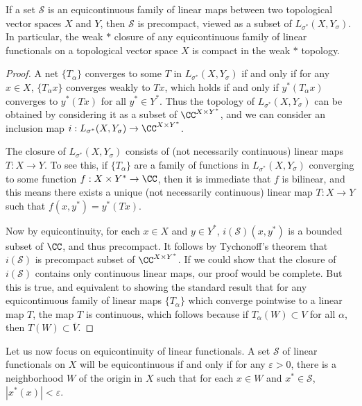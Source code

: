 \begin{theorem}
    If a set $\mathcal{S}$ is an equicontinuous family of linear maps between two topological vector spaces $X$ and $Y$, then $\mathcal{S}$ is precompact, viewed as a subset of $L_{\sigma^*}(X,Y_\sigma)$. In particular, the weak $*$ closure of any equicontinuous family of linear functionals on a topological vector space $X$ is compact in the weak $*$ topology.
\end{theorem}
\begin{proof}
    A net $\{ T_\alpha \}$ converges to some $T$ in $L_{\sigma^*}(X,Y_\sigma)$ if and only if for any $x \in X$, $\{ T_\alpha x \}$ converges weakly to $Tx$, which holds if and only if $y^*(T_\alpha x)$ converges to $y^*(Tx)$ for all $y^* \in Y^*$. Thus the topology of $L_{\sigma^*}(X,Y_\sigma)$ can be obtained by considering it as a subset of $\CC^{X \times Y^*}$, and we can consider an inclusion map $i: L_{\sigma^*}(X,Y_\sigma) \to \CC^{X \times Y^*}$.

    The closure of $L_{\sigma^*}(X,Y_\sigma)$ consists of (not necessarily continuous) linear maps $T: X \to Y$. To see this, if $\{ T_\alpha \}$ are a family of functions in $L_{\sigma^*}(X,Y_\sigma)$ converging to some function $f: X \times Y^* \to \CC$, then it is immediate that $f$ is bilinear, and this means there exists a unique (not necessarily continuous) linear map $T: X \to Y$ such that $f(x,y^*) = y^*(Tx)$.

    Now by equicontinuity, for each $x \in X$ and $y \in Y^*$, $i(\mathcal{S})(x,y^*)$ is a bounded subset of $\CC$, and thus precompact. It follows by Tychonoff's theorem that $i(\mathcal{S})$ is precompact subset of $\CC^{X \times Y^*}$. If we could show that the closure of $i(\mathcal{S})$ contains only continuous linear maps, our proof would be complete. But this is true, and equivalent to showing the standard result that for any equicontinuous family of linear maps $\{ T_\alpha \}$ which converge pointwise to a linear map $T$, the map $T$ is continuous, which follows because if $T_\alpha(W) \subset V$ for all $\alpha$, then $T(W) \subset \overline{V}$.
\end{proof}

Let us now focus on equicontinuity of linear functionals. A set $\mathcal{S}$ of linear functionals on $X$ will be equicontinuous if and only if for any $\varepsilon > 0$, there is a neighborhood $W$ of the origin in $X$ such that for each $x \in W$ and $x^* \in \mathcal{S}$, $|x^*(x)| < \varepsilon$.

